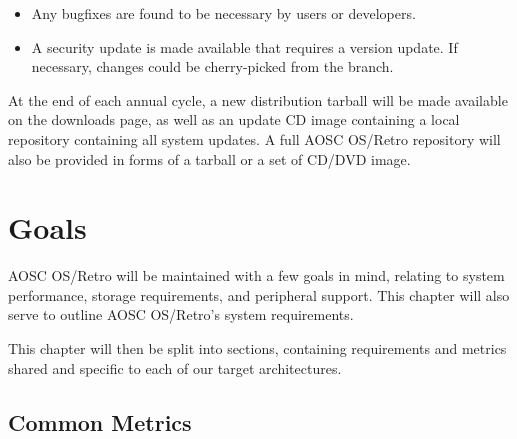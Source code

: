     \begin{itemize}
        \item Any bugfixes are found to be necessary by users or developers.
        \item A security update is made available that requires a version update.
            If necessary, changes could be cherry-picked from the  branch.
    \end{itemize}

    At the end of each annual cycle, a new distribution tarball will be made available on the downloads page, as well as an update CD image containing a local repository containing all system updates. A full AOSC OS/Retro repository will also be provided in forms of a tarball or a set of CD/DVD image.





    \chapter{Goals}

    AOSC OS/Retro will be maintained with a few goals in mind, relating to system performance, storage requirements, and peripheral support. This chapter will also serve to outline AOSC OS/Retro's system requirements.

    This chapter will then be split into sections, containing requirements and metrics shared and specific to each of our target architectures.

    \section{Common Metrics}

